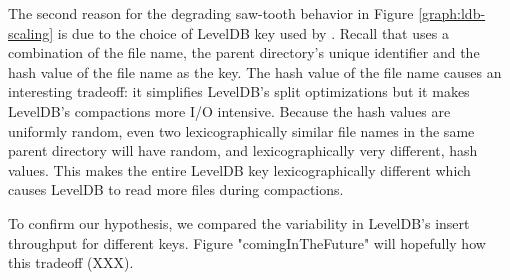 The second reason for the degrading saw-tooth behavior in Figure
\ref{graph:ldb-scaling} is due to the choice of LevelDB key used by \tfs{}.
Recall that \tfs{} uses a combination of the file name, the parent directory's
unique identifier and the hash value of the file name as the key. 
The hash value of the file name causes an interesting tradeoff: it simplifies
LevelDB's split optimizations but it makes LevelDB's compactions more I/O
intensive.
Because the hash values are uniformly random, even two lexicographically
similar file names in the same parent directory will have random, and
lexicographically very different, hash values.
This makes the entire LevelDB key lexicographically different which causes
LevelDB to read more files during compactions.

To confirm our hypothesis, we compared the variability in LevelDB's insert
throughput for different keys.
Figure "comingInTheFuture" will hopefully how this tradeoff (XXX).

